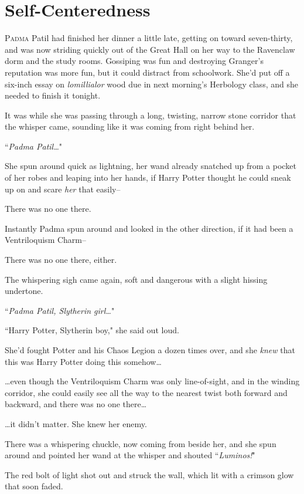 \chapter{Self-Centeredness}

\lettrine{P}{adma} Patil had finished her dinner a little late, getting on toward seven-thirty, and was now striding quickly out of the Great Hall on her way to the Ravenclaw dorm and the study rooms. Gossiping was fun and destroying Granger's reputation was more fun, but it could distract from schoolwork. She'd put off a six-inch essay on \emph{lomillialor} wood due in next morning's Herbology class, and she needed to finish it tonight.

It was while she was passing through a long, twisting, narrow stone corridor that the whisper came, sounding like it was coming from right behind her.

``\emph{Padma Patil{\ldots}}"

She spun around quick as lightning, her wand already snatched up from a pocket of her robes and leaping into her hands, if Harry Potter thought he could sneak up on and scare \emph{her} that easily\---

There was no one there.

Instantly Padma spun around and looked in the other direction, if it had been a Ventriloquism Charm\---

There was no one there, either.

The whispering sigh came again, soft and dangerous with a slight hissing undertone.

``\emph{Padma Patil, Slytherin girl{\ldots}}"

``Harry Potter, Slytherin boy," she said out loud.

She'd fought Potter and his Chaos Legion a dozen times over, and she \emph{knew} that this was Harry Potter doing this somehow{\ldots}

{\ldots}even though the Ventriloquism Charm was only line-of-sight, and in the winding corridor, she could easily see all the way to the nearest twist both forward and backward, and there was no one there{\ldots}

{\ldots}it didn't matter. She knew her enemy.

There was a whispering chuckle, now coming from beside her, and she spun around and pointed her wand at the whisper and shouted ``\emph{Luminos!}"

The red bolt of light shot out and struck the wall, which lit with a crimson glow that soon faded.

